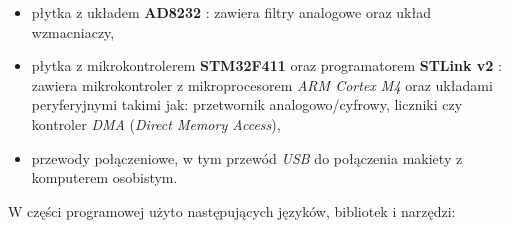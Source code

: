 \begin{itemize}

    \item płytka z układem \textbf{AD8232} \cite{AD8232BS} \cite{AD8232ds}: zawiera filtry analogowe oraz układ wzmacniaczy,


    \item płytka z mikrokontrolerem \textbf{STM32F411} oraz programatorem \textbf{STLink v2} \cite{STM32F4DS} \cite{NUCLEO}: 
    zawiera mikrokontroler z mikroprocesorem \textit{ARM Cortex M4} oraz układami peryferyjnymi takimi jak: 
    przetwornik analogowo/cyfrowy, liczniki czy kontroler \textit{DMA} (\textit{Direct Memory Access}),
    

    \item przewody połączeniowe, w tym przewód \textit{USB} do połączenia makiety z komputerem osobistym.


\end{itemize}

W części programowej użyto następujących języków, bibliotek i narzędzi:

